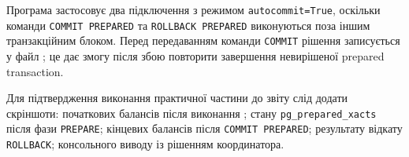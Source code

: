 Програма застосовує два підключення з режимом \texttt{autocommit=True}, оскільки команди \texttt{COMMIT PREPARED} та \texttt{ROLLBACK PREPARED} виконуються поза іншим транзакційним блоком. Перед передаванням команди \texttt{COMMIT} рішення записується у файл ; це дає змогу після збою повторити завершення невирішеної prepared transaction.

Для підтвердження виконання практичної частини до звіту слід додати скріншоти: початкових балансів після виконання ; стану \texttt{pg\_prepared\_xacts} після фази \texttt{PREPARE}; кінцевих балансів після \texttt{COMMIT PREPARED}; результату відкату \texttt{ROLLBACK}; консольного виводу  із рішенням координатора.
